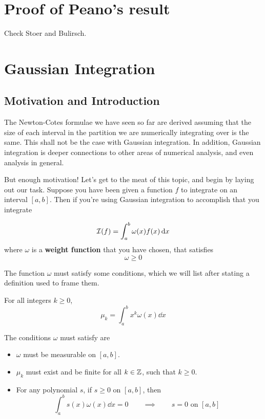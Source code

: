 
\section{Proof of Peano's result}

Check Stoer and Bulirsch.

\section{Gaussian Integration}

\subsection{Motivation and Introduction}

The Newton-Cotes formulae we have seen so far are derived assuming that the size of each interval in the partition we are numerically integrating over is the same. This shall not be the case with Gaussian integration. In addition, Gaussian integration is deeper connections to other areas of numerical analysis, and even analysis in general.

But enough motivation! Let's get to the meat of this topic, and begin by laying out our task. Suppose you have been given a function $f$ to integrate on an interval $[a, b]$. Then if you're using Gaussian integration to accomplish that you integrate
\begin{defn}
  \[
    \mathcal{I}(f) = \int_a^b \omega(x) f(x) \dd{x}
  \]
  where $\omega$ is a \textbf{weight function} that you have chosen, that satisfies
  \[
    \omega \geq 0
  \]
\end{defn}
The function $\omega$ must satisfy some conditions, which we will list after stating a definition used to frame them.
\begin{defn}
  For all integers $k \geq 0$,
  \[
    \mu_k = \int_a^b x^k \omega(x) \dd{x}
  \]
\end{defn}
The conditions $\omega$ must satisfy are
\begin{defn}
  \label{apr4b:conds:weight}
  \hfill

\begin{itemize}
\item
  $\omega$ must be measurable on $[a, b]$.
  
\item
  $\mu_k$ must exist and be finite for all $k \in \mathbb{Z}$, such that $k \geq 0$.

\item
  For any polynomial $s$, if $s \geq 0$ on $[a, b]$, then
  \[
    \int_a^b s(x) \omega(x) \dd{x} = 0
    \qquad \implies \qquad
    s = 0 \text{ on $[a, b]$ }
  \]
\end{itemize}
\end{defn}

